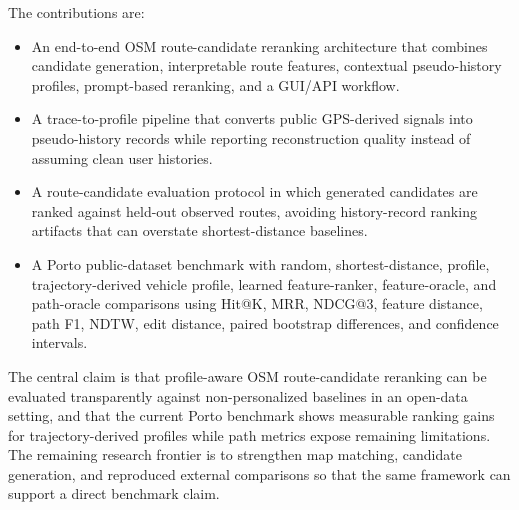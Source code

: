 The contributions are:

\begin{itemize}
  \item An end-to-end OSM route-candidate reranking architecture that combines candidate generation, interpretable route features, contextual pseudo-history profiles, prompt-based reranking, and a GUI/API workflow.
  \item A trace-to-profile pipeline that converts public GPS-derived signals into pseudo-history records while reporting reconstruction quality instead of assuming clean user histories.
  \item A route-candidate evaluation protocol in which generated candidates are ranked against held-out observed routes, avoiding history-record ranking artifacts that can overstate shortest-distance baselines.
  \item A Porto public-dataset benchmark with random, shortest-distance, profile, trajectory-derived vehicle profile, learned feature-ranker, feature-oracle, and path-oracle comparisons using Hit@K, MRR, NDCG@3, feature distance, path F1, NDTW, edit distance, paired bootstrap differences, and confidence intervals.
\end{itemize}

The central claim is that profile-aware OSM route-candidate reranking can be evaluated transparently against non-personalized baselines in an open-data setting, and that the current Porto benchmark shows measurable ranking gains for trajectory-derived profiles while path metrics expose remaining limitations. The remaining research frontier is to strengthen map matching, candidate generation, and reproduced external comparisons so that the same framework can support a direct benchmark claim.
